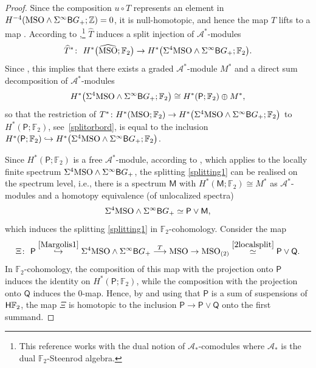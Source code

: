 \documentclass[pdftex]{sigma}
\numberwithin{equation}{section}
\newcommand{\F}{\mathbb{F}}
\newcommand{\Z}{\mathbb{Z}}
\newcommand{\MSO}{{\rm MSO}}
\newcommand{\sB}{{\sf B}}
\begin{document}
\begin{proof}
Since the composition $u \circ T$ represents an element in $H^{-4}( \MSO \wedge \Sigma^{\infty} \sB G_+; \Z) = 0$, it is null-homotopic, and hence the map $T$ lifts to a map \smash{$\widehat T \colon \Sigma^4 \MSO \wedge \Sigma^{\infty} \sB G_+ \to \widehat \MSO$}.
According to \cite[Theorem 2.2]{Fuehring_bordism},\footnote{This reference works with the dual notion of $\mathscr{A}_*$-comodules where $\mathscr{A}_*$ is the dual $\F_2$-Steenrod algebra.} $\widehat T$ induces a split injection of $\mathscr{A}^*$-modules
\[
 \widehat T^* \colon\ H^*\big( \widehat\MSO; \F_2\big) \to H^{*}\big( \Sigma^4 \MSO \wedge \Sigma^{\infty} \sB G_+; \F_2\big) .
\]
Since \smash{$\big( \widehat \MSO\big)_{(2)} \simeq \sf{P} \vee \sf{Q'}$}, this implies that there exists a graded $\mathscr{A}^*$-module $M^*$ and a direct sum decomposition of $\mathscr{A}^{*}$-modules
\begin{equation} \label{splitting1}
 H^{*}\big(\Sigma^4 \MSO \wedge \Sigma^{\infty} \sB G_+; \F_2\big) \cong H^*(\mathsf{P}; \F_2) \oplus M^*,
\end{equation}
so that the restriction of $T^* \colon H^{*} (\MSO; \F_2) \to H^*\big(\Sigma^4 \MSO \wedge \Sigma^{\infty} \sB G_+; \F_2\big)$ to $H^*(\mathsf{P}; \F_2)$, see~\eqref{splitorbord}, is equal to the inclusion $H^*(\mathsf{P}; \F_2) \hookrightarrow H^{*}\big(\Sigma^4 \MSO \wedge \Sigma^{\infty} \sB G_+; \F_2\big)$.

Since $H^*(\mathsf{P}; \F_2)$ is a free $\mathscr{A}^*$-module, according to \cite[Theorem 2\,(a)]{Mar74}, which applies to the locally finite spectrum $\Sigma^4 \MSO \wedge \Sigma^{\infty} \sB G_+$, the splitting \eqref{splitting1} can be realised on the spectrum level, i.e., there is a spectrum $\mathsf{M}$ with $H^*(\mathsf{M} ;\F_2) \cong M^*$ as $\mathscr{A}^*$-modules and a homotopy equivalence (of unlocalized spectra)
\begin{equation} \label{Margolis1}
\Sigma^4 \MSO \wedge \Sigma^{\infty} \sB G_+ \simeq \mathsf{P} \vee \mathsf{M},
 \end{equation}
which induces the splitting \eqref{splitting1} in $\F_2$-cohomology.
Consider the map
\[
 \Xi \colon\ \mathsf{P} \stackrel{\eqref{Margolis1}}{\hookrightarrow} \Sigma^4 \MSO \wedge \Sigma^{\infty} \sB G_+ \stackrel{T}{\longrightarrow} \MSO \to \MSO_{(2)} \stackrel{\eqref{2localsplit}}{\simeq} \mathsf{P} \vee \mathsf{Q} .
 \]
In $\F_2$-cohomology, the composition of this map with the projection onto $\mathsf{P}$ induces the identity on $H^*(\mathsf{P}; \F_2)$, while the composition with the projection onto $\mathsf{Q}$ induces the $0$-map.
Hence, by \cite[Theorem 3]{Mar74} and using that $\mathsf{P}$ is a sum of suspensions of ${\sf H}\F_2$, the map $\Xi$ is homotopic to the inclusion $\mathsf{P} \to \mathsf{P} \vee \mathsf{Q}$ onto the first summand.


\end{proof}
\end{document}

